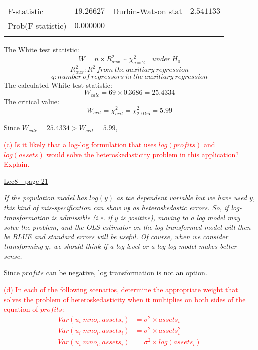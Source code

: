 \documentclass[12pt]{report}
\begin{document}
\begin{table}[H]
\begin{tabular}{lrrrr}
		\multicolumn{1}{l}{F-statistic}&\multicolumn{1}{r}{$19.26627$}&\multicolumn{2}{l}{Durbin-Watson stat}&\multicolumn{1}{r}{$2.541133$}\\
		\multicolumn{1}{l}{Prob(F-statistic)}&\multicolumn{1}{r}{$0.000000$}&\multicolumn{1}{c}{}&\multicolumn{1}{c}{}&\multicolumn{1}{c}{}\\
		[4.5pt] \hline \\ [-4.5pt]
	\end{tabular}
\end{table} \vspace{-\baselineskip} \noindent
The White test statistic:
$$W = n \times R^2_{aux} \sim \chi_{q=2}^2 \quad under\ H_0$$ $$R^2_{aux}: R^2\ from\ the\ auxiliary\ regression$$ $$q:number\ of\ regressors\ in\ the\ auxiliary\ regression$$ The calculated White test statistic: $$W_{calc} = 69 \times 0.3686 = 25.4334$$ The critical value: $$W_{crit} = \chi^2_{crit} = \chi_{2,0.95}^2 = 5.99$$

\noindent Since $W_{calc} = 25.4334 > W_{crit} = 5.99$, 



\newpage
\justify
\noindent \textcolor{red}
{
	(c) Is it likely that a log-log formulation that uses $log(profits)$ and $log(assets)$ would solve the heteroskedasticity problem in this application? Explain.
}

\noindent \uline{Lec8 - page 21}

\noindent \textit{If the population model has $log(y)$ as the dependent variable but we have used $y$, this kind of mis-specification can show up as heteroskedastic errors. So, if log-transformation is admissible (i.e. if $y$ is positive), moving to a log model may solve the problem, and the OLS estimator on the log-transformed model will then be BLUE and standard errors will be useful. Of course, when we consider transforming $y$, we should think if a log-level or a log-log model makes better sense.}

\noindent Since $profits$ can be negative, log transformation is not an option.


\newpage
\justify
\noindent \textcolor{red}
{
	(d) In each of the following scenarios, determine the appropriate weight that solves the problem of heteroskedasticity when it multiplies on both sides of the equation of $profits$: \begin{align*}
		Var(u_i|mno_i, assets_i) &= \sigma^2 \times assets_i \\
		Var(u_i|mno_i, assets_i) &= \sigma^2 \times assets_i^2 \\
		Var(u_i|mno_i, assets_i) &= \sigma^2 \times log(assets_i)
	\end{align*}
}
\end{document}
